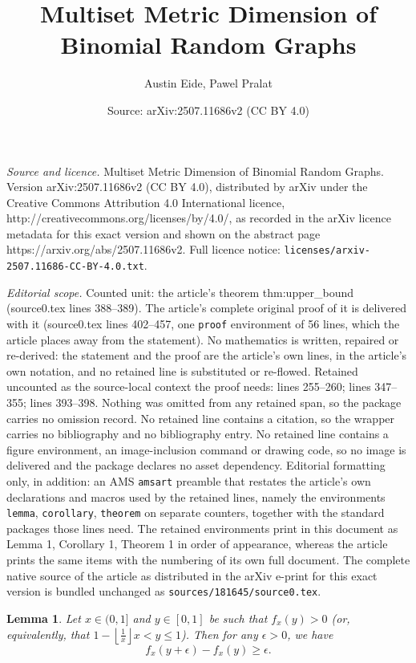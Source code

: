 \documentclass[10pt,a4paper]{amsart}
\title{Multiset Metric Dimension of Binomial Random Graphs}
\author{Austin Eide, Pawel Pralat}
\date{Source: arXiv:2507.11686v2 (CC BY 4.0)}
\newtheorem{lemma}{Lemma}
\begin{document}
\maketitle

\noindent\emph{Source and licence.} Multiset Metric Dimension of Binomial Random Graphs. Version arXiv:2507.11686v2 (CC BY 4.0), distributed by arXiv under the Creative Commons Attribution 4.0 International licence, http://creativecommons.org/licenses/by/4.0/, as recorded in the arXiv licence metadata for this exact version and shown on the abstract page https://arxiv.org/abs/2507.11686v2. Full licence notice: \texttt{licenses/arxiv-2507.11686-CC-BY-4.0.txt}.\par\smallskip

\noindent\textit{Editorial scope.} Counted unit: the article's theorem thm:upper\_bound (source0.tex lines 388--389). The article's complete original proof of it is delivered with it (source0.tex lines 402--457, one \texttt{proof} environment of 56 lines, which the article places away from the statement). No mathematics is written, repaired or re-derived: the statement and the proof are the article's own lines, in the article's own notation, and no retained line is substituted or re-flowed.  Retained uncounted as the source-local context the proof needs: lines 255--260; lines 347--355; lines 393--398.  Nothing was omitted from any retained span, so the package carries no omission record.  No retained line contains a citation, so the wrapper carries no bibliography and no bibliography entry.  No retained line contains a figure environment, an image-inclusion command or drawing code, so no image is delivered and the package declares no asset dependency.  Editorial formatting only, in addition: an AMS \texttt{amsart} preamble that restates the article's own declarations and macros used by the retained lines, namely the environments \texttt{lemma}, \texttt{corollary}, \texttt{theorem} on separate counters, together with the standard packages those lines need.  The retained environments print in this document as Lemma 1, Corollary 1, Theorem 1 in order of appearance, whereas the article prints the same items with the numbering of its own full document.  The complete native source of the article as distributed in the arXiv e-print for this exact version is bundled unchanged as \texttt{sources/181645/source0.tex}.
\begin{lemma}\label{lem:exponent_func2}
	Let $x \in (0,1]$ and $y \in [0,1]$ be such that $f_{x}(y) > 0$ (or, equivalently, that $1-\left\lfloor\frac{1}{x}\right\rfloor x < y \leq 1$). Then for any $\epsilon > 0$, we have
	$$
		f_{x}(y+\epsilon) - f_{x}(y) \geq \epsilon.
	$$
\end{lemma}
\end{document}
